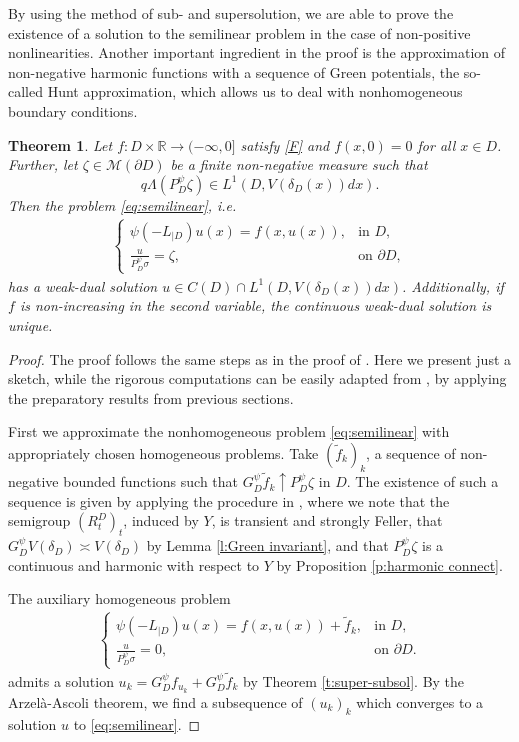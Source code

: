 \documentclass[12pt,a4paper,onecolumn]{article}
\newtheorem{thm}{Theorem}[section]
\theoremstyle{definition}
\newcommand{\R}{\mathbb{R}}
\newcommand{\1}{\mathbf 1}
\newcommand{\de}{\delta_D}
\newcommand{\wt}{\widetilde}
\newcommand{\LLL}{L^1(D,V(\de(x))dx)}
\newcommand{\MM}{\mathcal{M}}
\newcommand{\Lo}{\psi(-L_{|D})}
\newcommand{\GDP}{G_D^\psi}
\newcommand{\PDS}{P^{\psi}_{ D}}
\numberwithin{equation}{section}
\begin{document}
By using the method of sub- and supersolution, we are able to prove the existence of a solution to the semilinear problem in the case of non-positive nonlinearities. Another important ingredient in the proof is the approximation of non-negative harmonic functions with a sequence of Green potentials, the so-called Hunt approximation, which allows us to deal with nonhomogeneous boundary conditions.

 \begin{thm}\label{t:non-positive semilinear problem}
		Let $f:D\times \R\to(-\infty,0]$ satisfy \ref{F} and $f(x,0)=0$ for all $x\in D$. Further, let $\zeta\in \MM(\partial D)$ be a finite non-negative measure such that
		\begin{equation}\label{eq:semilinear integral condition}
		    q\Lambda(\PDS\zeta)\in\LLL.
		\end{equation}
		Then the problem \eqref{eq:semilinear}, i.e.
		\begin{align*}
			\begin{cases}
				\Lo u(x)=f(x,u(x)),&\textrm{in $D$},\\
				\frac{u}{\PDS\sigma}=\zeta,&\textrm{on $\partial D$},
			\end{cases}
		\end{align*}
		has a weak-dual solution $u\in C(D) \cap \LLL$. Additionally, if $f$ is non-increasing in the second variable, the continuous weak-dual solution is unique.
	\end{thm}
 \begin{proof}
     The proof   follows the same steps as in the proof of  \cite[Theorem 5.10]{Bio23cpaa}. Here we present just a sketch, while the rigorous computations can be easily adapted from \cite[Theorem 5.10]{Bio23cpaa}, by applying the preparatory results from previous sections.
     
     First we approximate the nonhomogeneous problem \eqref{eq:semilinear} with appropriately chosen homogeneous problems. Take $(\wt f_k)_k$, a sequence of non-negative  bounded functions such that $\GDP \wt f_k \uparrow \PDS \zeta$ in $D$. The existence of such a sequence is given by applying the procedure in \cite[Appendix A.1]{BVW-na21}, where we note that the semigroup $(R_t^D)_t$, induced by $Y$, is transient and strongly Feller, that $\GDP V(\de)\asymp V(\de)$ by Lemma \ref{l:Green invariant}, and that $\PDS\zeta$ is a continuous and harmonic with respect to $Y$ by Proposition \ref{p:harmonic connect}.
     
     The auxiliary homogeneous problem
     \begin{align*}
     	\begin{cases}
     		\Lo u(x)=f(x,u(x))+\wt f_k,&\textrm{in $D$},\\
     		\frac{u}{\PDS\sigma}=0,&\textrm{on $\partial D$}.
     	\end{cases}
     \end{align*}
     admits a solution $u_k=\GDP f_{u_k}+\GDP \wt f_k$ by Theorem \ref{t:super-subsol}.
     By the Arzel\`{a}-Ascoli theorem, we find a subsequence of $(u_ k)_k$ which converges to a solution $u$ to \eqref{eq:semilinear}. 
     
 \end{proof}
 
\end{document}
